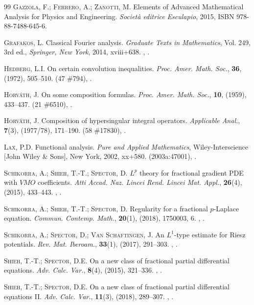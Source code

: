 \documentclass[11pt,hyp,]{nyjm}
\numberwithin{equation}{section}
\theoremstyle{remark}
\begin{document}
\begin{thebibliography}{99}
 {\scshape Gazzola, F.; Ferrero, A.; Zanotti, M.} Elements of Advanced Mathematical Analysis for Physics and Engineering. {\em Societ\`a editrice Esculapio}, 2015, ISBN 978-88-7488-645-6.

 {\scshape Grafakos, L.} Classical Fourier analysis. {\em Graduate Texts in Mathematics}, Vol. 249, 3rd ed., {\em Springer, New York}, 2014, xviii+638.  , .

 {\scshape Hedberg, L.I.} On certain convolution inequalities. {\em Proc. Amer. Math. Soc.}, {\bf 36}, (1972), 505--510.  (47 \#794), .

 {\scshape Horv\'ath, J.} On some composition formulas. {\em Proc. Amer. Math. Soc.}, {\bf 10}, (1959), 433--437.  (21 \#6510), .

 {\scshape Horv\'ath, J.} Composition of hypersingular integral operators. {\em Applicable Anal.}, {\bf 7}(3), (1977/78), 171--190.  (58 \#17830), .

 {\scshape Lax, P.D.} Functional analysis. {\em Pure and Applied Mathematics}, Wiley-Interscience [John Wiley \& Sons], New York, 2002, xx+580.  (2003a:47001), .

 {\scshape Schikorra, A.; Shieh, T.-T.; Spector, D.} $L^p$ theory for fractional gradient PDE with $VMO$ coefficients. {\em Atti Accad. Naz. Lincei Rend. Lincei Mat. Appl.}, {\bf 26}(4), (2015), 433--443.  , .

 {\scshape Schikorra, A.; Shieh, T.-T.; Spector, D.} Regularity for a fractional $p$-Laplace equation. {\em Commun. Contemp. Math.}, {\bf 20}(1), (2018), 1750003, 6.  , .


 {\scshape Schikorra, A.; Spector, D.; Van Schaftingen, J.} An $L^1$-type estimate for Riesz potentials. {\em Rev. Mat. Iberoam.}, {\bf 33}(1), (2017), 291--303. , .

 {\scshape Shieh, T.-T.; Spector, D.E.} On a new class of fractional partial differential equations. {\em Adv. Calc. Var.}, {\bf 8}(4), (2015), 321--336.  , .

 {\scshape Shieh, T.-T.; Spector, D.E.} On a new class of fractional partial differential equations II. {\em Adv. Calc. Var.}, {\bf 11}(3), (2018), 289--307.  , .


\end{thebibliography}
\end{document}
